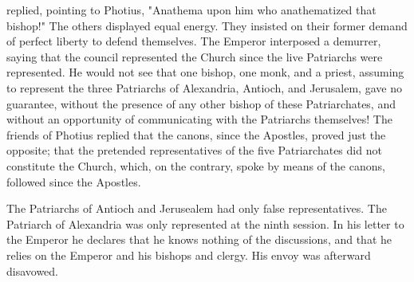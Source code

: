 replied, pointing to Photius, "Anathema upon him who anathematized that bishop!" The others displayed equal energy. They insisted on their former demand of perfect liberty to defend themselves. The Emperor interposed a demurrer, saying that the council represented the Church since the live Patriarchs were represented. He would not see that one bishop, one monk, and a priest, assuming to represent the three Patriarchs of Alexandria, Antioch, and Jerusalem, gave no guarantee, without the presence of any other bishop of these Patriarchates, and without an opportunity of communicating with the Patriarchs themselves! The friends of Photius replied that the canons, since the Apostles, proved just the opposite; that the pretended representatives of the five Patriarchates did not constitute the Church, which, on the contrary, spoke by means of the canons, followed since the Apostles.

The Patriarchs of Antioch and Jerusealem had only false representatives. The Patriarch of Alexandria was only represented at the ninth session. In his letter to the Emperor he declares that he knows nothing of the discussions, and that he relies on the Emperor and his bishops and clergy. His envoy was afterward disavowed.

